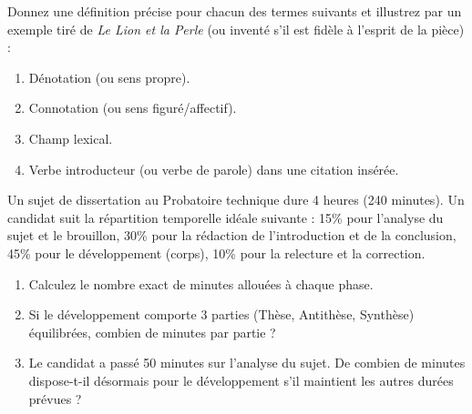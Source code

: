 \documentclass[11pt]{article}
\newcounter{popsec}
\newcounter{popsub}
\newcommand{\courssub}[1]{%
  \stepcounter{popsub}%
  \par\vspace{9pt}\noindent{\popxbold\fontsize{11.5}{13}\selectfont\color{popink}{\color{poporange}\thepopsec.\thepopsub}\hspace{6pt}#1}\par\nopagebreak\vspace{4pt}
}
\begin{document}
\begin{exercice}
Donnez une définition précise pour chacun des termes suivants et illustrez par un exemple tiré de \emph{Le Lion et la Perle} (ou inventé s'il est fidèle à l'esprit de la pièce) :
\begin{enumerate}
\item Dénotation (ou sens propre).
\item Connotation (ou sens figuré/affectif).
\item Champ lexical.
\item Verbe introducteur (ou verbe de parole) dans une citation insérée.
\end{enumerate}
\end{exercice}

\begin{exercice}
Un sujet de dissertation au Probatoire technique dure 4 heures (240 minutes). Un candidat suit la répartition temporelle idéale suivante : 15\% pour l'analyse du sujet et le brouillon, 30\% pour la rédaction de l'introduction et de la conclusion, 45\% pour le développement (corps), 10\% pour la relecture et la correction.
\begin{enumerate}
\item Calculez le nombre exact de minutes allouées à chaque phase.
\item Si le développement comporte 3 parties (Thèse, Antithèse, Synthèse) équilibrées, combien de minutes par partie ?
\item Le candidat a passé 50 minutes sur l'analyse du sujet. De combien de minutes dispose-t-il désormais pour le développement s'il maintient les autres durées prévues ?
\end{enumerate}
\end{exercice}

\courssub{Je m'entraîne}
\end{document}
